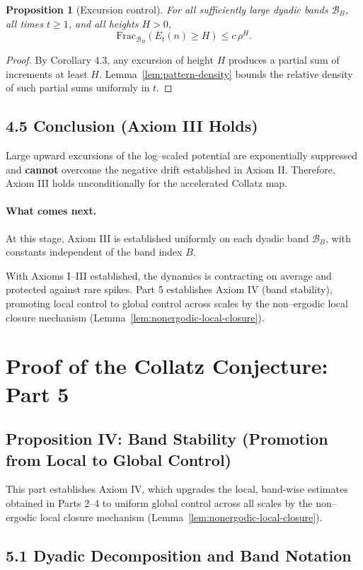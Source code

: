 \documentclass[preprint,12pt]{elsarticle}
\newtheorem{proposition}{Proposition}
\newcommand{\BandFrac}[2]{\mathrm{Frac}_{#1}\!\left(#2\right)} %
\begin{document}
\begin{proposition}[Excursion control]
For all sufficiently large dyadic bands $\mathcal{B}_B$, all times $t\ge 1$, and all heights $H>0$,
\[
\BandFrac{\mathcal{B}_B}{E_t(n) \ge H} \le c\,\rho^{H}.
\]
\end{proposition}
\begin{proof}
By Corollary 4.3, any excursion of height $H$ produces a partial sum of increments at least $H$.
Lemma~\ref{lem:pattern-density} bounds the relative density of such partial sums uniformly in $t$.
\end{proof}

\subsection*{4.5 Conclusion (Axiom III Holds)}
\label{sec:axiomIII_conclusion}
Large upward excursions of the log–scaled potential are exponentially suppressed and \textbf{cannot} overcome the negative drift established in Axiom II.
Therefore, Axiom III holds unconditionally for the accelerated Collatz map.

\paragraph{What comes next.}
At this stage, Axiom III is established uniformly on each dyadic band
\(\mathcal{B}_B\), with constants independent of the band index \(B\).

With Axioms I–III established, the dynamics is contracting on average and protected against rare spikes. Part 5 establishes Axiom IV (band stability), promoting local control to global control across scales by the non--ergodic local closure mechanism (Lemma~\ref{lem:nonergodic-local-closure}).

\section{Proof of the Collatz Conjecture: Part 5}
\subsection{Proposition IV: Band Stability (Promotion from Local to Global Control)}
This part establishes Axiom IV, which upgrades the local, band-wise estimates obtained in Parts 2–4 to uniform global control across all scales by the non--ergodic local closure mechanism (Lemma~\ref{lem:nonergodic-local-closure}).

\subsection{5.1 Dyadic Decomposition and Band Notation}
\end{document}
